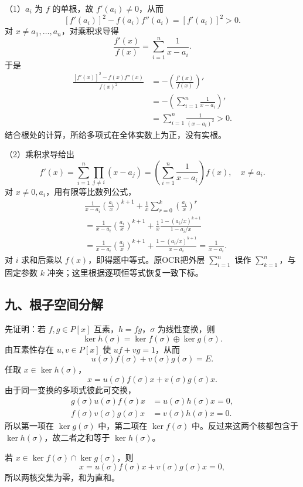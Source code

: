 \documentclass[11pt,fontset=fandol]{ctexart}
\begin{document}
（1）\(a_i\) 为 \(f\) 的单根，故 \(f'(a_i)\ne0\)，从而 \[
[f'(a_i)]^2-f(a_i)f''(a_i)=[f'(a_i)]^2>0.
\] 对 \(x\ne a_1,\ldots,a_n\)，对乘积求导得 \[
\frac{f'(x)}{f(x)}=\sum_{i=1}^n\frac1{x-a_i}.
\] 于是 \[
\begin{aligned}
\frac{[f'(x)]^2-f(x)f''(x)}{f(x)^2}
&=-\left(\frac{f'(x)}{f(x)}\right)'\\
&=-\left(\sum_{i=1}^n\frac1{x-a_i}\right)'\\
&=\sum_{i=1}^n\frac1{(x-a_i)^2}>0.
\end{aligned}
\] 结合根处的计算，所给多项式在全体实数上为正，没有实根。

（2）乘积求导给出 \[
f'(x)=\sum_{i=1}^n\prod_{j\ne i}(x-a_j)
=\left(\sum_{i=1}^n\frac1{x-a_i}\right)f(x),\quad x\ne a_i.
\] 对 \(x\ne0,a_i\)，用有限等比数列公式， \[
\begin{aligned}
&\frac1{x-a_i}\left(\frac{a_i}{x}\right)^{k+1}
+\frac1x\sum_{r=0}^k\left(\frac{a_i}{x}\right)^r\\
&=\frac1{x-a_i}\left(\frac{a_i}{x}\right)^{k+1}
+\frac1x\frac{1-(a_i/x)^{k+1}}{1-a_i/x}\\
&=\frac1{x-a_i}\left(\frac{a_i}{x}\right)^{k+1}
+\frac{1-(a_i/x)^{k+1}}{x-a_i}
=\frac1{x-a_i}.
\end{aligned}
\] 对 \(i\) 求和后乘以 \(f(x)\)，即得题中等式。原OCR把外层
\(\sum_{i=1}^n\) 误作 \(\sum_{k=1}^n\)，与固定参数 \(k\)
冲突；这里根据逐项恒等式恢复一致下标。

\subsection{九、根子空间分解}\label{ux4e5dux6839ux5b50ux7a7aux95f4ux5206ux89e3}

先证明：若 \(f,g\in P[x]\) 互素，\(h=fg\)，\(\sigma\) 为线性变换，则 \[
\ker h(\sigma)=\ker f(\sigma)\oplus\ker g(\sigma).
\] 由互素性存在 \(u,v\in P[x]\) 使 \(uf+vg=1\)，从而 \[
u(\sigma)f(\sigma)+v(\sigma)g(\sigma)=E.
\] 任取 \(x\in\ker h(\sigma)\)， \[
x=u(\sigma)f(\sigma)x+v(\sigma)g(\sigma)x.
\] 由于同一变换的多项式彼此可交换， \[
\begin{aligned}
g(\sigma)u(\sigma)f(\sigma)x&=u(\sigma)h(\sigma)x=0,\\
f(\sigma)v(\sigma)g(\sigma)x&=v(\sigma)h(\sigma)x=0.
\end{aligned}
\] 所以第一项在 \(\ker g(\sigma)\) 中，第二项在 \(\ker f(\sigma)\)
中。反过来这两个核都包含于 \(\ker h(\sigma)\)，故二者之和等于
\(\ker h(\sigma)\)。

若 \(x\in\ker f(\sigma)\cap\ker g(\sigma)\)，则 \[
x=u(\sigma)f(\sigma)x+v(\sigma)g(\sigma)x=0,
\] 所以两核交集为零，和为直和。
\end{document}
